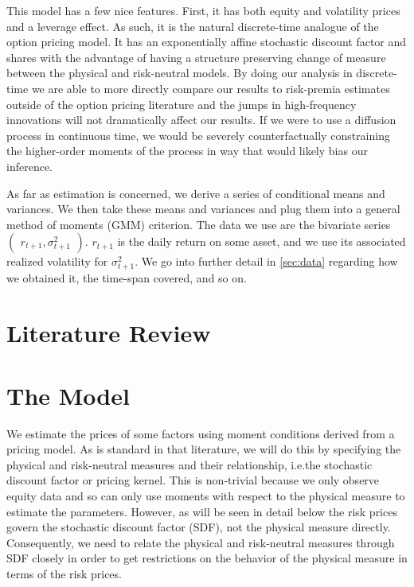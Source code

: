 \documentclass[11pt, letterpaper, twoside, final]{article}
\begin{document}
This model has a few nice features. 
First, it has both equity and volatility prices and a leverage effect. 
As such, it is the natural discrete-time analogue of the \textcite{heston1993closedform} option pricing model. 
It has an exponentially affine stochastic discount factor  and shares with \textcite{heston1993closedform} the
advantage of having a structure preserving change of measure between the physical and risk-neutral models.
By doing our analysis in discrete-time we are able to more directly compare our results to risk-premia estimates
outside of the option pricing literature and the jumps in high-frequency innovations will not dramatically affect
our results.  
If we were to use a diffusion process in continuous time, we would be severely counterfactually constraining the
higher-order  moments of the process in way that would likely bias our inference. 

As far as estimation is concerned, we derive a series of conditional means and variances.
We then take these means and variances and plug them into a general method of moments (GMM) criterion.
The data we use are the bivariate series $\begin{pmatrix} r_{t+1}, \sigma^2_{t+1} \end{pmatrix}$.
$r_{t+1}$ is the daily return on some asset, and we use its associated realized volatility for $\sigma^2_{t+1}$.
We go into further detail in \cref{sec:data} regarding how we obtained it, the time-span covered, and so on.

\section{Literature Review}\label{sec:lit_review}


\section{The Model}\label{sec:model}

\addtocounter{subsection}{1}

We estimate the prices of some factors using moment conditions derived from a pricing model. 
As is standard in that literature, we will do  this by specifying the physical and risk-neutral measures and their
relationship, i.e.\@ the stochastic discount factor or pricing kernel.
This is non-trivial because we only observe equity data and so can only use moments with respect to the physical
measure to estimate the parameters. 
However, as will be seen in detail below the risk prices govern the stochastic discount factor (SDF), not the
physical measure directly. 
Consequently, we need to relate the physical and risk-neutral measures through SDF closely in order to get
restrictions on the behavior of the physical measure in terms of the risk prices. 
\end{document}
